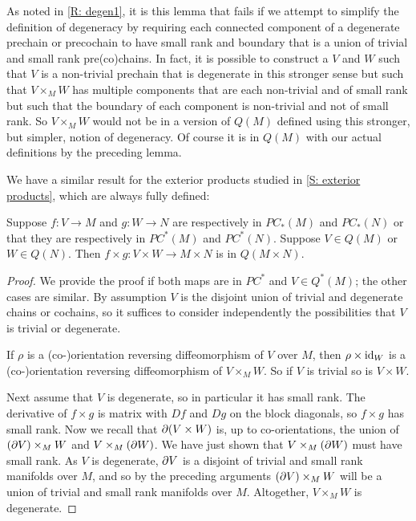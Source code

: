 \begin{remark}\label{R: degen2}
As noted in \cref{R: degen1}, it is this lemma that fails if we attempt to simplify the definition of degeneracy by requiring each connected component of a degenerate prechain or precochain to have small rank and boundary that is a union of trivial and small rank pre(co)chains. In fact, it is possible to construct a $V$ and $W$ such that $V$ is a non-trivial prechain that is degenerate in this stronger sense but such that $V\times_M W$ has multiple components that are each non-trivial and of small rank but such that the boundary of each component is non-trivial and not of small rank. So $V\times_MW$ would not be in a version of $Q(M)$ defined using this stronger, but simpler, notion of degeneracy. Of course it is in $Q(M)$ with our actual definitions by the preceding lemma.
\end{remark}

We have a similar result for the exterior products studied in \cref{S: exterior products}, which are always fully defined:

\begin{lemma}\label{L: exterior Q}
Suppose $f \colon V \to M$ and $g:W\to N$ are respectively in $PC_*(M)$ and $PC_*(N)$ or that they are respectively in $PC^*(M)$ and $PC^*(N)$. Suppose $V\in Q(M)$ or $W\in Q(N)$. Then $f\times g:V\times W\to M\times N$ is in $Q(M\times N)$.
\end{lemma}
\begin{proof}
We provide the proof if both maps are in $PC^*$ and $V\in Q^*(M)$; the other cases are similar. By assumption $V$ is the disjoint union of trivial and degenerate chains or cochains, so it suffices to consider independently the possibilities that $V$ is trivial or degenerate.

If $\rho$ is a (co-)orientation reversing diffeomorphism of $V$ over $M$, then  $\rho\times  \mathrm{id}_W$ is a (co-)orientation reversing diffeomorphism of  $V\times_M W$. So if $V$ is trivial so is $V\times W$.

Next assume that $V$ is degenerate, so in particular it has small rank. The derivative of $f\times g$ is matrix with $Df$ and $Dg$ on the block diagonals, so $f\times g$ has small rank.
Now we recall that $\partial(V\times W)$ is, up to co-orientations, the union of $(\partial V)\times_M W$ and $V\times_M(\partial W)$. We have just shown that  $V\times_M(\partial W)$ must have small rank. As $V$ is degenerate, $\partial V$ is a disjoint of trivial and small rank manifolds over $M$, and so by the preceding arguments $(\partial V)\times_M W$ will be a union of trivial and small rank manifolds over $M$. Altogether, $V\times_M W$ is degenerate.
\end{proof}



